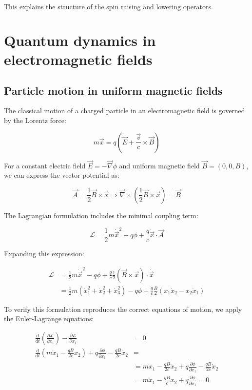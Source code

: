 \documentclass[italian]{HKNdocument}
\begin{document}
This explains the structure of the spin raising and lowering operators.

\section{Quantum dynamics in electromagnetic fields}
\subsection{Particle motion in uniform magnetic fields}
The classical motion of a charged particle in an electromagnetic field is governed by the Lorentz force:

\begin{equation}
m \ddot{\vec{x}}=q(\vec{E}+\frac{\vec{v}}{c} \times \vec{B})
\end{equation}

For a constant electric field $\vec{E}=-\vec{\nabla} \phi$ and uniform magnetic field $\vec{B}=(0,0,B)$, we can express the vector potential as:

\begin{equation}
\vec{A}=\frac{1}{2} \vec{B} \times \vec{x} \Rightarrow \vec{\nabla} \times(\frac{1}{2} \vec{B} \times \vec{x})=\vec{B}
\end{equation}

The Lagrangian formulation includes the minimal coupling term:

\begin{equation}
\mathcal{L}=\frac{1}{2} m \dot{\vec{x}}^{2}-q \phi+\frac{q}{c} \dot{\vec{x}} \cdot \vec{A}
\end{equation}

Expanding this expression:

\begin{align}
\mathcal{L} &= \frac{1}{2} m \dot{\vec{x}}^{2}-q \phi+\frac{q}{c} \frac{1}{2} (\vec{B} \times \vec{x}) \cdot \dot{\vec{x}}\\
&= \frac{1}{2} m(\dot{x}_{1}^{2}+\dot{x}_{2}^{2}+\dot{x}_{3}^{2})-q \phi+\frac{q}{c} \frac{B}{2}(x_{1} \dot{x}_{2}-x_{2}\dot{x}_{1})
\end{align}

To verify this formulation reproduces the correct equations of motion, we apply the Euler-Lagrange equations:

\begin{align}
\frac{\mathrm{d}}{\mathrm{d} t}(\frac{\partial \mathcal{L}}{\partial \dot{x}_{1}})-\frac{\partial \mathcal{L}}{\partial x_{1}} &= 0 \\
\frac{\mathrm{d}}{\mathrm{d} t}(m \dot{x}_{1}-\frac{q B}{2 c} x_{2})+q \frac{\partial \phi}{\partial x_{1}}-\frac{q B}{2 c} \dot{x}_{2} &= \\
&= m \ddot{x}_{1}-\frac{q B}{2 c} \dot{x}_{2}+q \frac{\partial \phi}{\partial x_{1}}-\frac{q B}{2 c} \dot{x}_{2}\\
&= m \ddot{x}_{1}-\frac{q B}{c} \dot{x}_{2}+q \frac{\partial \phi}{\partial x_{1}}=0
\end{align}
\end{document}
